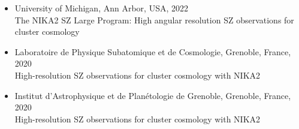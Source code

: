 \begin{itemize}[leftmargin=20pt]

    \item University of Michigan, Ann Arbor, USA, 2022 \\
        The NIKA2 SZ Large Program: High angular resolution SZ observations for cluster cosmology

    \item Laboratoire de Physique Subatomique et de Cosmologie, Grenoble, France, 2020 \\
        High-resolution SZ observations for cluster cosmology with NIKA2

    \item Institut d'Astrophysique et de Plan\'etologie de Grenoble, Grenoble, France, 2020 \\
        High-resolution SZ observations for cluster cosmology with NIKA2
\vspace{-5pt}
\end{itemize}
